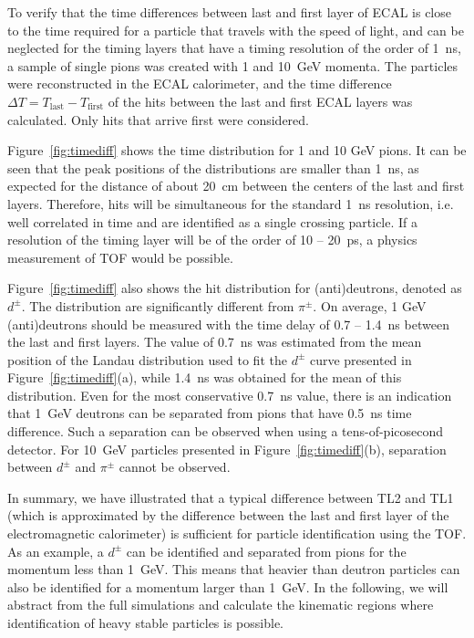 \documentclass[final,1p,11pt]{elsarticle}
\begin{document}
To verify that the time differences between last and first layer of ECAL is close to the time
required for a particle that travels with the speed of light, and can be neglected for the timing layers that
have a timing resolution of the order of 1~ns, a sample of single pions was created with 1 and 10~GeV momenta. 
The particles were reconstructed in the ECAL calorimeter,
and the time difference $\Delta T= T_{\mathrm{last}}-T_{\mathrm{first}}$ of the hits between the last and first ECAL layers was calculated.
Only hits that arrive first were considered.

Figure~\ref{fig:timediff} shows the time distribution for 1 and 10 GeV pions. It can be seen that the peak positions of the distributions are smaller
than 1~ns, as expected for the distance of about 20~cm between  the centers of the last and first layers.
Therefore, hits will be simultaneous for the
standard 1~ns resolution, i.e. well correlated in time and are identified as a single crossing particle.
If a resolution of the timing layer will be of the order of 10 -- 20~ps, a physics measurement of TOF would be possible.

Figure~\ref{fig:timediff} also shows the hit distribution for (anti)deutrons, denoted as $d^{\pm}$. The distribution are significantly different from $\pi^{\pm}$. On average, 1 GeV
(anti)deutrons should be measured with the time delay of 0.7 -- 1.4~ns between the last and first layers.
The value of 0.7~ns was estimated from the mean position of the Landau distribution used to fit the $d^{\pm}$ 
curve presented in Figure~\ref{fig:timediff}(a),
while 1.4~ns was obtained for the mean of this distribution. Even for the most conservative 0.7~ns value, there is an indication that 1~GeV
deutrons can be separated from pions that have 0.5~ns time difference. Such a separation can be observed when using a tens-of-picosecond detector.
For 10~GeV particles presented in Figure~\ref{fig:timediff}(b), separation between $d^{\pm}$ and $\pi^{\pm}$ cannot be observed.

In summary, we have illustrated that a typical difference between TL2 and TL1 (which is approximated by the difference
between the last and first layer of the electromagnetic calorimeter) is sufficient for particle identification using the TOF.
As an example, a $d^{\pm}$ can be identified and separated from pions for the momentum less than 1~GeV.
This means that  heavier than deutron particles can also be identified for a momentum larger than 1~GeV.
In the following, we will abstract from the full simulations and calculate the kinematic regions  where identification of heavy stable 
particles is possible.
 
\end{document}
